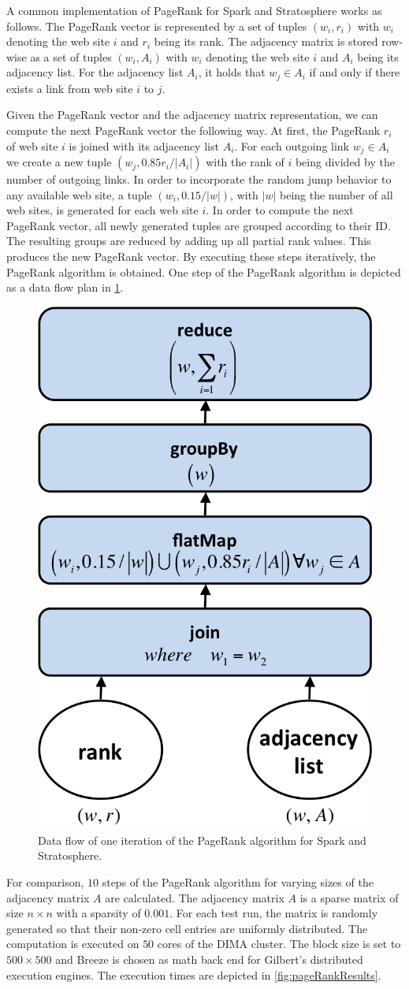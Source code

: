 A common implementation of PageRank for Spark and Stratosphere works as follows.
The PageRank vector is represented by a set of tuples $(w_i, r_i)$ with $w_i$ denoting the web site $i$ and $r_i$ being its rank.
The adjacency matrix is stored row-wise as a set of tuples $(w_i, A_i)$ with $w_i$ denoting the web site $i$ and $A_i$ being its adjacency list.
For the adjacency list $A_i$, it holds that $w_j \in A_i$ if and only if there exists a link from web site $i$ to $j$.

Given the PageRank vector and the adjacency matrix representation, we can compute the next PageRank vector the following way.
At first, the PageRank $r_i$ of web site $i$ is joined with its adjacency list $A_i$.
For each outgoing link $w_j \in A_i$ we create a new tuple $(w_j, 0.85r_i/\left|A_i\right|)$ with the rank of $i$ being divided by the number of outgoing links.
In order to incorporate the random jump behavior to any available web site, a tuple $(w_i, 0.15/|w|)$, with $|w|$ being the number of all web sites, is generated for each web site $i$.
In order to compute the next PageRank vector, all newly generated tuples are grouped according to their ID.
The resulting groups are reduced by adding up all partial rank values.
This produces the new PageRank vector.
By executing these steps iteratively, the PageRank algorithm is obtained.
One step of the PageRank algorithm is depicted as a data flow plan in \cref{fig:pageRankDataFlow}.

\begin{figure}[!h]
	\centering
	\includegraphics[width=.3\linewidth]{images/pageRankStep.png}
	\caption{Data flow of one iteration of the PageRank algorithm for Spark and Stratosphere.}
	\label{fig:pageRankDataFlow}
\end{figure}

For comparison, $10$ steps of the PageRank algorithm for varying sizes of the adjacency matrix $A$ are calculated.
The adjacency matrix $A$ is a sparse matrix of size $n \times n$ with a sparsity of $0.001$.
For each test run, the matrix is randomly generated so that their non-zero cell entries are uniformly distributed.
The computation is executed on $50$ cores of the DIMA cluster.
The block size is set to $500 \times 500$ and Breeze is chosen as math back end for Gilbert's distributed execution engines.
The execution times are depicted in \cref{fig:pageRankResults}.


